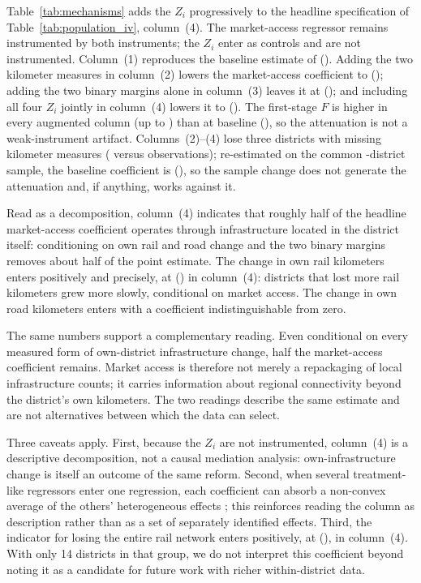 Table~\ref{tab:mechanisms} adds the $Z_i$ progressively to the
headline specification of Table~\ref{tab:population_iv}, column~(4).
The market-access regressor remains instrumented by both instruments;
the $Z_i$ enter as controls and are not instrumented. Column~(1)
reproduces the baseline estimate of \mainPopCoefIVBoth{}
(\mainPopSEIVBoth{}). Adding the two kilometer measures in column~(2)
lowers the market-access coefficient to \mechKmCoef{} (\mechKmSE{});
adding the two binary margins alone in column~(3) leaves it at
\mechBinCoef{} (\mechBinSE{}); and including all four $Z_i$ jointly
in column~(4) lowers it to \mechAllZCoef{} (\mechAllZSE{}). The
first-stage $F$ is higher in every augmented column (up to
\mechMaxAugF{}) than at baseline (\mechBaselineF{}), so the attenuation
is not a weak-instrument artifact. Columns~(2)--(4) lose three
districts with missing kilometer measures (\mechNAug{} versus \mechNBase{}
observations); re-estimated on the common \mechNAug{}-district sample, the
baseline coefficient is \mechBaselineCommonCoef{}
(\mechBaselineCommonSE{}), so the sample change does not generate the
attenuation and, if anything, works against it.



Read as a decomposition, column~(4) indicates that roughly half of
the headline market-access coefficient operates through
infrastructure located in the district itself: conditioning on own
rail and road change and the two binary margins removes about half of
the point estimate. The change in own rail kilometers enters
positively and precisely, at \mechRailKmCoef{} (\mechRailKmSE{}) in
column~(4): districts that lost more rail kilometers grew more
slowly, conditional on market access. The change in own road
kilometers enters with a coefficient indistinguishable from zero.

The same numbers support a complementary reading. Even conditional on
every measured form of own-district infrastructure change, half the
market-access coefficient remains. Market access is therefore not
merely a repackaging of local infrastructure counts; it carries
information about regional connectivity beyond the district's own
kilometers. The two readings describe the same estimate and are not
alternatives between which the data can select.

Three caveats apply. First, because the $Z_i$ are not instrumented,
column~(4) is a descriptive decomposition, not a causal mediation
analysis: own-infrastructure change is itself an outcome of the same
reform. Second, when several treatment-like regressors enter one
regression, each coefficient can absorb a non-convex average of the
others' heterogeneous effects
\citep{goldsmithpinkhamhullkolesar2024}; this reinforces reading the
column as description rather than as a set of separately identified
effects. Third, the indicator for losing the entire rail network
enters positively, at \mechLostRailCoef{} (\mechLostRailSE{}), in
column~(4). With
only 14 districts in that group, we do not interpret this
coefficient beyond noting it as a candidate for future work with
richer within-district data.

